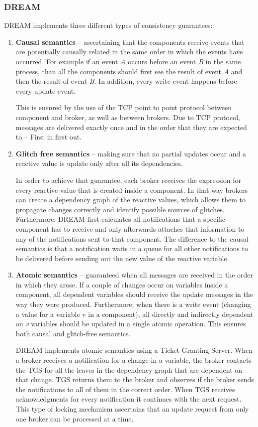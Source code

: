 \documentclass{sigplanconf}
\begin{document}
\subsubsection{DREAM}
DREAM \cite{dream} implements three different types of consistency guarantees:

\begin{enumerate}
  \item \textbf{Causal semantics} -- ascertaining that the components receive events that are potentially causally related in the same order in which the events have occurred. For example if an event \textit{A} occurs before an event \textit{B} in the same process, than all the components should first see the result of event \textit{A} and then the result of event \textit{B}. In addition, every write event happens before every update event.  

This is ensured by the use of the TCP point to point protocol between component and broker, as well as between brokers. Due to TCP protocol, messages are delivered exactly once and in the order that they are expected to -- First in first out.

  \item \textbf{Glitch free semantics} -- making sure that no partial updates occur and a reactive value is update only after all its dependencies. 

In order to achieve that guarantee, each broker receives the expression for every  reactive value that is created inside a component. In that way brokers can create a dependency graph of the reactive values, which allows them to propagate changes correctly and identify possible sources of glitches. Furthermore, DREAM first calculates all notifications that a specific component has to receive and only afterwards attaches that information to any of the notifications sent to that component. The difference to the causal semantics is that a notification waits in a queue for all other notifications to be delivered before sending out the new value of the reactive variable.

  \item \textbf{Atomic semantics} -- guaranteed when all messages are received in the order in which they arose. If a couple of changes occur on variables inside a component, all dependent variables should receive the update messages in the way they were produced. Furthermore, when there is a write event (changing a value for a variable v in a component), all directly and indirectly dependent on \textit{v} variables should be updated in a single atomic operation. This ensures both causal and glitch-free semantics.
  
DREAM implements atomic semantics using a Ticket Granting Server. When a broker receives a notification for a change in a variable, the broker contacts the TGS for all the leaves in the dependency graph that are dependent on that change. TGS returns them to the broker and observes if the broker sends the notifications to all of them in the correct order. When TGS receives acknowledgments for every notification it continues with the next request. This type of locking mechanism ascertains that an update request from only one broker can be processed at a time.

\end{enumerate}
\end{document}
